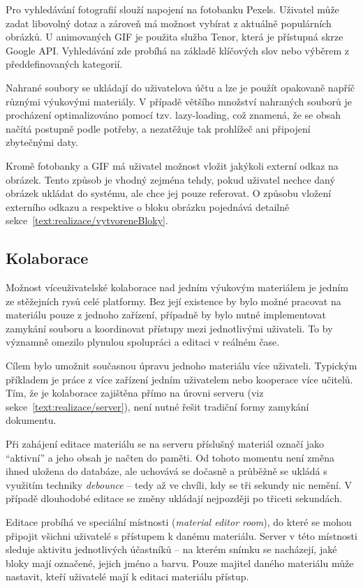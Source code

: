 Pro vyhledávání fotografií slouží napojení na fotobanku Pexels. 
Uživatel může zadat libovolný dotaz a zároveň má možnost vybírat z aktuálně populárních obrázků. 
U animovaných GIF je použita služba Tenor, která je přístupná skrze Google API. 
Vyhledávání zde probíhá na základě klíčových slov nebo výběrem z předdefinovaných kategorií.

Nahrané soubory se ukládají do uživatelova účtu a lze je použít opakovaně napříč různými výukovými materiály.
V případě většího množství nahraných souborů je procházení optimalizováno pomocí tzv. lazy-loading, což znamená, že se obsah načítá postupně podle potřeby, a nezatěžuje tak prohlížeč ani připojení zbytečnými daty.

Kromě fotobanky a GIF má uživatel možnost vložit jakýkoli externí odkaz na obrázek.
Tento způsob je vhodný zejména tehdy, pokud uživatel nechce daný obrázek ukládat do systému, ale chce jej pouze referovat. 
O způsobu vložení externího odkazu a respektive o bloku obrázku pojednává detailně sekce~\ref{text:realizace/vytvoreneBloky}.

\subsection{Kolaborace}

Možnost víceuživatelské kolaborace nad jedním výukovým materiálem je jedním ze stěžejních rysů celé platformy.
Bez její existence by bylo možné pracovat na materiálu pouze z jednoho zařízení, případně by bylo nutné implementovat zamykání souboru a koordinovat přístupy mezi jednotlivými uživateli. 
To by významně omezilo plynulou spolupráci a editaci v reálném čase.

Cílem bylo umožnit současnou úpravu jednoho materiálu více uživateli. 
Typickým příkladem je práce z více zařízení jedním uživatelem nebo kooperace více učitelů. 
Tím, že je kolaborace zajištěna přímo na úrovni serveru (viz sekce~\ref{text:realizace/server}), není nutné řešit tradiční formy zamykání dokumentu.

Při zahájení editace materiálu se na serveru příslušný materiál označí jako \enquote{aktivní} a jeho obsah je načten do paměti. 
Od tohoto momentu není změna ihned uložena do databáze, ale uchovává se dočasně a průběžně se ukládá s využitím techniky \textit{debounce} -- tedy až ve chvíli, kdy se tři sekundy nic nemění. 
V případě dlouhodobé editace se změny ukládají nejpozději po třiceti sekundách.

Editace probíhá ve speciální místnosti (\textit{material editor room}), do které se mohou připojit všichni uživatelé s přístupem k danému materiálu. 
Server v této místnosti sleduje aktivitu jednotlivých účastníků -- na kterém snímku se nacházejí, jaké bloky mají označené, jejich jméno a barvu. 
Pouze majitel daného materiálu může nastavit, kteří uživatelé mají k editaci materiálu přístup.


